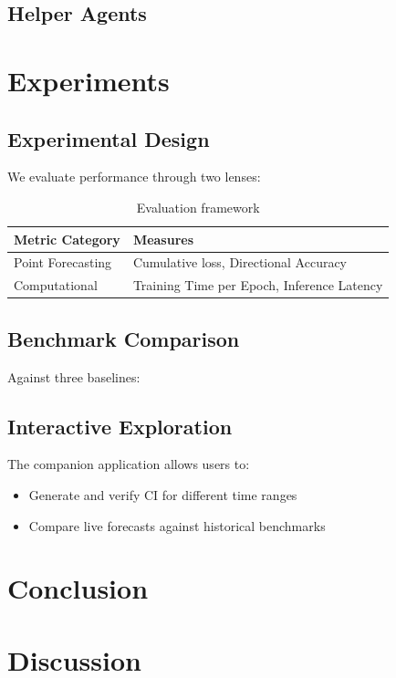\documentclass[12pt]{article}
\begin{document}
\subsection{Helper Agents}

\section{Experiments}
\label{sec:experiments}

\subsection{Experimental Design}
We evaluate performance through two lenses:

\begin{table}[h]
\centering
\caption{Evaluation framework}
\label{tab:eval}
\begin{tabular}{ll}
\toprule
\textbf{Metric Category} & \textbf{Measures} \\
\midrule
Point Forecasting & Cumulative loss, Directional Accuracy \\
Computational & Training Time per Epoch, Inference Latency \\
\bottomrule
\end{tabular}
\end{table}

\subsection{Benchmark Comparison}
Against three baselines:

\subsection{Interactive Exploration}
The companion application allows users to:
\begin{itemize}
\item Generate and verify CI for different time ranges
\item Compare live forecasts against historical benchmarks
\end{itemize}

\section{Conclusion}
\label{sec:conclusions}

\section{Discussion}
\label{sec:discussion}
\end{document}
